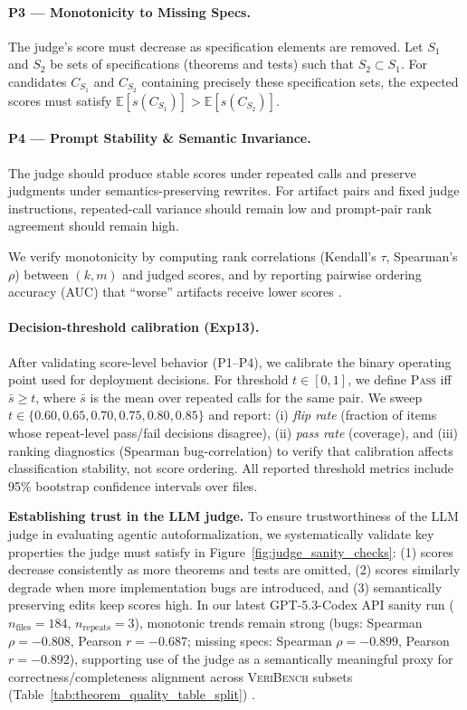 \documentclass{article}
\begin{document}
\paragraph{P3 — Monotonicity to Missing Specs.}
The judge’s score must decrease as specification elements are removed.
Let $S_1$ and $S_2$ be sets of specifications (theorems and tests) such that $S_2 \subset S_1$.
For candidates $C_{S_1}$ and $C_{S_2}$ containing precisely these specification sets, the expected scores must satisfy $\mathbb{E}[s(C_{S_1})] > \mathbb{E}[s(C_{S_2})]$.

\paragraph{P4 — Prompt Stability \& Semantic Invariance.}
The judge should produce stable scores under repeated calls and preserve judgments under semantics-preserving rewrites.
For artifact pairs and fixed judge instructions, repeated-call variance should remain low and prompt-pair rank agreement should remain high.

We verify monotonicity by computing rank correlations (Kendall's $\tau$, Spearman's $\rho$) between $(k,m)$ and judged scores, and by reporting pairwise ordering accuracy (AUC) that “worse'' artifacts receive lower scores \citep{TongZhang2024CodeJudge,Zhuo2024ICEScore}.

\paragraph{Decision-threshold calibration (Exp13).}
After validating score-level behavior (P1--P4), we calibrate the binary operating point used for deployment decisions.
For threshold $t\in[0,1]$, we define \textsc{Pass} iff $\bar{s}\ge t$, where $\bar{s}$ is the mean over repeated calls for the same pair.
We sweep $t\in\{0.60,0.65,0.70,0.75,0.80,0.85\}$ and report:
(i) \emph{flip rate} (fraction of items whose repeat-level pass/fail decisions disagree),
(ii) \emph{pass rate} (coverage),
and (iii) ranking diagnostics (Spearman bug-correlation) to verify that calibration affects classification stability, not score ordering.
All reported threshold metrics include 95\% bootstrap confidence intervals over files.

\textbf{Establishing trust in the LLM judge.} To ensure trustworthiness of the LLM judge in evaluating agentic autoformalization, we systematically validate key properties the judge must satisfy in Figure~\ref{fig:judge_sanity_checks}: (1) scores decrease consistently as more theorems and tests are omitted, (2) scores similarly degrade when more implementation bugs are introduced, and (3) semantically preserving edits keep scores high.
In our latest GPT-5.3-Codex API sanity run (\(n_\text{files}=184\), \(n_\text{repeats}=3\)), monotonic trends remain strong (bugs: Spearman \(\rho=-0.808\), Pearson \(r=-0.687\); missing specs: Spearman \(\rho=-0.899\), Pearson \(r=-0.892\)), supporting use of the judge as a semantically meaningful proxy for correctness/completeness alignment across \textsc{VeriBench} subsets (Table~\ref{tab:theorem_quality_table_split}) \citep{Li2024TrustLLMJudgments,Kocmi2024HumanVsLLM}.
\end{document}

